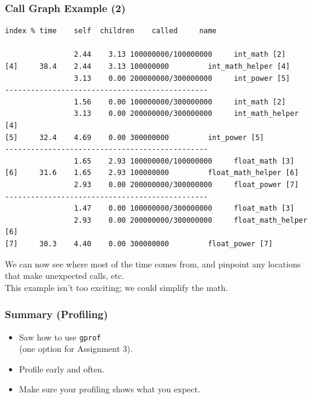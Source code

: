 \documentclass[aspectratio=43]{beamer}
\newenvironment{changemargin}[1]{%
  \begin{list}{}{%
    \setlength{\topsep}{0pt}%
    \setlength{\leftmargin}{#1}%
    \setlength{\rightmargin}{1em}
    \setlength{\listparindent}{\parindent}%
    \setlength{\itemindent}{\parindent}%
    \setlength{\parsep}{\parskip}%
  }%
  \item[]}{\end{list}}
\begin{document}
\begin{frame}[fragile]
  \frametitle{Call Graph Example (2)}

  \begin{changemargin}{1cm}
  \begin{lstlisting}[basicstyle=\tiny]
index % time    self  children    called     name

                2.44    3.13 100000000/100000000     int_math [2]
[4]     38.4    2.44    3.13 100000000         int_math_helper [4]
                3.13    0.00 200000000/300000000     int_power [5]
-----------------------------------------------
                1.56    0.00 100000000/300000000     int_math [2]
                3.13    0.00 200000000/300000000     int_math_helper [4]
[5]     32.4    4.69    0.00 300000000         int_power [5]
-----------------------------------------------
                1.65    2.93 100000000/100000000     float_math [3]
[6]     31.6    1.65    2.93 100000000         float_math_helper [6]
                2.93    0.00 200000000/300000000     float_power [7]
-----------------------------------------------
                1.47    0.00 100000000/300000000     float_math [3]
                2.93    0.00 200000000/300000000     float_math_helper [6]
[7]     30.3    4.40    0.00 300000000         float_power [7]
  \end{lstlisting}

  
 We can now see where most of the time comes from, and pinpoint any
      locations that make unexpected calls, etc.\\[1em]
 This example isn't too exciting; we could simplify the math.
  \end{changemargin}
\end{frame}

\begin{frame}
  \frametitle{Summary (Profiling)}

  \begin{changemargin}{1cm}
  \begin{itemize}
    \item Saw how to use {\tt gprof} \\ \qquad (one option for Assignment 3).
    \item Profile early and often.
    \item Make sure your profiling shows what you expect. 
  \end{itemize}
  \end{changemargin}
\end{frame}
\end{document}
